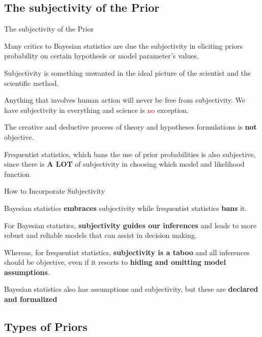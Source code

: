 \subsection{The subjectivity of the Prior}
\begin{frame}{The subjectivity of the Prior}
	\begin{vfilleditems}
		\item Many critics to Bayesian statistics are due the subjectivity
		in eliciting priors probability on certain hypothesis or model parameter's
		values.
		\item Subjectivity is something unwanted in the ideal picture of the
		scientist and the scientific method.
		\item Anything that involves human action will never be free from
		subjectivity.
		We have subjectivity in everything and science is \textcolor{red}{no} exception.
		\item The creative and deductive process of theory and hypotheses formulations
		is \textbf{not} objective.
		\item Frequentist statistics, which bans the use of prior probabilities
		is also subjective, since there is \textbf{A LOT} of subjectivity in
		choosing which model and likelihood function \parencite{jaynesProbabilityTheoryLogic2003, vandeschootBayesianStatisticsModelling2021}
	\end{vfilleditems}
\end{frame}

\begin{frame}{How to Incorporate Subjectivity}
	\begin{vfilleditems}
		\item Bayesian statistics \textbf{embraces} subjectivity while
		frequentist statistics \textbf{bans} it.
		\item For Bayesian statistics, \textbf{subjectivity guides our inferences}
		and leads to more robust and reliable models that can assist in
		decision making.
		\item Whereas, for frequentist statistics, \textbf{subjectivity is a taboo}
		and all inferences should be objective,
		even if it resorts to \textbf{hiding and omitting model assumptions}.
		\item Bayesian statistics also has assumptions and subjectivity,
		but these are \textbf{declared and formalized}
	\end{vfilleditems}
\end{frame}

\subsection{Types of Priors}

